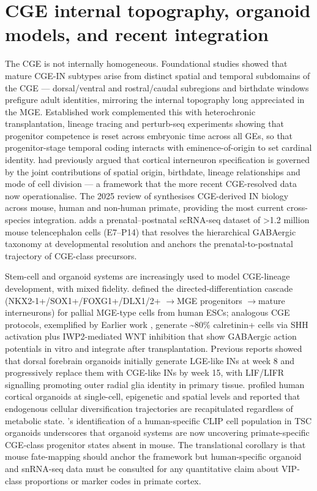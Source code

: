 \documentclass[11pt]{article}
\let\origrightarrow\rightarrow
\def\rightarrow{\ensuremath{\origrightarrow}}
\begin{document}
\section{CGE internal topography, organoid models, and recent integration}

The CGE is not internally homogeneous. Foundational studies \citep{Garg2025} showed that mature CGE-IN subtypes arise from distinct spatial and temporal subdomains of the CGE --- dorsal/ventral and rostral/caudal subregions and birthdate windows prefigure adult identities, mirroring the internal topography long appreciated in the MGE. Established work \citep{Bright2025} complemented this with heterochronic transplantation, lineage tracing and perturb-seq experiments showing that progenitor competence is reset across embryonic time across all GEs, so that progenitor-stage temporal coding interacts with eminence-of-origin to set cardinal identity. \citet{Bandler2017} had previously argued that cortical interneuron specification is governed by the joint contributions of spatial origin, birthdate, lineage relationships and mode of cell division --- a framework that the more recent CGE-resolved data \citep{Garg2025, Bright2025} now operationalise. The 2025 review of \citet{Horton2025} synthesises CGE-derived IN biology across mouse, human and non-human primate, providing the most current cross-species integration. \citet{Vanvelthoven2025} adds a prenatal--postnatal scRNA-seq dataset of \textgreater 1.2 million mouse telencephalon cells (E7--P14) that resolves the hierarchical GABAergic taxonomy at developmental resolution and anchors the prenatal-to-postnatal trajectory of CGE-class precursors.

Stem-cell and organoid systems are increasingly used to model CGE-lineage development, with mixed fidelity. \citet{Bershteyn2023} defined the directed-differentiation cascade (NKX2-1+/SOX1+/FOXG1+/DLX1/2+ \rightarrow MGE progenitors \rightarrow mature interneurons) for pallial MGE-type cells from human ESCs; analogous CGE protocols, exemplified by Earlier work \citep{Du2025}, generate {\textasciitilde}80\% calretinin+ cells via SHH activation plus IWP2-mediated WNT inhibition that show GABAergic action potentials in vitro and integrate after transplantation. Previous reports \citep{Andrews2023} showed that dorsal forebrain organoids initially generate LGE-like INs at week 8 and progressively replace them with CGE-like INs by week 15, with LIF/LIFR signalling promoting outer radial glia identity in primary tissue. \citet{Uzquiano2022} profiled human cortical organoids at single-cell, epigenetic and spatial levels and reported that endogenous cellular diversification trajectories are recapitulated regardless of metabolic state. \citet{Eichmuller2022}'s identification of a human-specific CLIP cell population in TSC organoids underscores that organoid systems are now uncovering primate-specific CGE-class progenitor states absent in mouse. The translational corollary is that mouse fate-mapping should anchor the framework but human-specific organoid and snRNA-seq data must be consulted for any quantitative claim about VIP-class proportions or marker codes in primate cortex.
\end{document}
